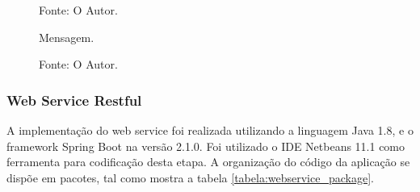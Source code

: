 \begin{figure}[H]
\begin{minipage}[b]{0.45\linewidth}
    	\label{figura:calendario}
    	\captionsetup{singlelinecheck = false, format= hang, justification=raggedright, labelsep=space, width=6.5cm}
    	\caption*{\footnotesize Fonte: O Autor.}
    \end{minipage}
\end{figure}

\begin{figure}[H]
	\caption{Mensagem.}
	\centering %
	\label{figura:treinamento}
	\captionsetup{singlelinecheck = false, format= hang, justification=raggedright, labelsep=space, width=6.5cm}
	\caption*{\footnotesize Fonte: O Autor.}
\end{figure}

\subsubsection{Web Service Restful}

A implementação do web service foi realizada utilizando a linguagem Java 1.8, e o framework Spring Boot na versão 2.1.0. Foi utilizado o IDE Netbeans 11.1 como ferramenta para codificação desta etapa. A organização do código da aplicação se dispõe em pacotes, tal como mostra a tabela \ref{tabela:webservice_package}.

